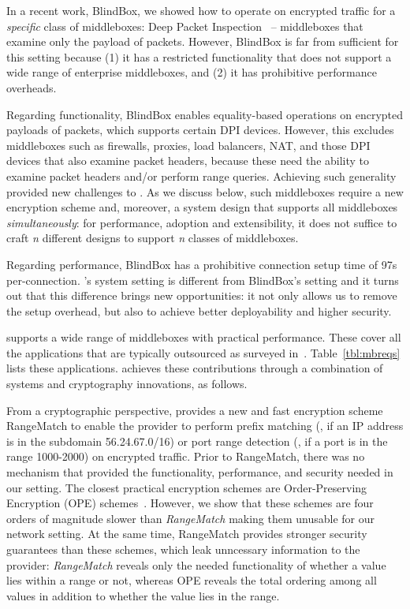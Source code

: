 In a recent work, BlindBox, we showed how to operate on encrypted traffic for a {\em specific} class of middleboxes: Deep Packet Inspection~\cite{blindbox} -- middleboxes that examine only the payload of packets. 
However, BlindBox is far from sufficient for this setting because
 (1) it has a restricted functionality that does not support a wide range of enterprise middleboxes, and (2) it has prohibitive performance overheads.
 
 Regarding functionality, BlindBox enables equality-based operations on  encrypted payloads of packets, which supports certain DPI devices. However, this excludes middleboxes such as firewalls, proxies, load balancers, NAT,  and those DPI devices that also examine packet headers, because these need the ability to examine packet headers and/or perform range queries. 
 Achieving such generality provided new challenges to \sys. 
As we discuss below, such middleboxes require a new encryption scheme and, moreover, a system design that supports all middleboxes {\it simultaneously}: for performance, adoption and extensibility, it does not suffice to craft {\it n} different designs to support {\it n} classes of middleboxes. 

 
Regarding performance, BlindBox has a prohibitive connection setup time of 97s per-connection. 
\sys's system setting is different from BlindBox's setting and it turns out that this difference brings new opportunities: it
not only allows us to remove the setup overhead, but also to achieve better deployability and higher security. 

   \sys supports a wide range of middleboxes with practical performance. These cover all the applications that are typically outsourced as surveyed in~\cite{aplomb}. Table~\ref{tbl:mbreqs} lists these applications. 
   \sys achieves these contributions through a combination of systems and cryptography innovations, as follows.
   
   From a cryptographic perspective, \sys provides a new and fast encryption scheme RangeMatch  to enable the provider to perform prefix matching (\eg{}, if an IP address is in the subdomain 56.24.67.0/16) or port range detection (\eg{}, if a port is in the range 1000-2000) on encrypted traffic.
 Prior to RangeMatch, there was no mechanism that provided the functionality, performance, and  security needed in our setting. The closest practical encryption schemes are Order-Preserving Encryption (OPE) schemes~\cite{boldyreva:ope,popa:mope,popa:cryptdb}. 
However, we show that these schemes are four orders of magnitude slower than {\it RangeMatch} making them unusable for our network setting. At the same time, RangeMatch provides stronger security guarantees than these schemes, which leak unncessary information to the provider: {\em RangeMatch} reveals only the needed functionality of whether a value lies within a range or not, whereas OPE reveals the total ordering among all values in addition to whether the value lies in the range.

